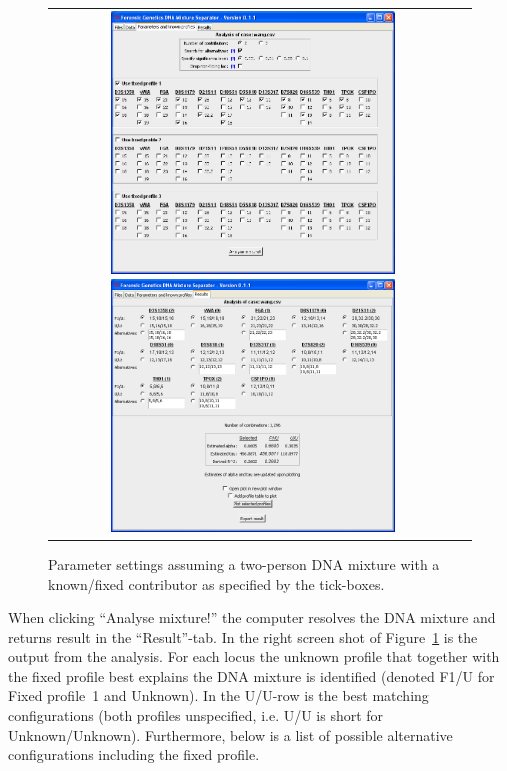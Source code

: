 \documentclass[a4paper,11pt]{article}
\begin{document}
\begin{figure}[!h]
  \centering
      \begin{tabular}{cc}
      \parbox[b]{7.5cm}{\includegraphics[width=7.5cm]{param_suspect}}
      \parbox[b]{7.5cm}{\includegraphics[width=7.5cm]{result_suspect}}
      \end{tabular}
      \caption{\label{fig:paramsuspect}Parameter settings assuming a
        two-person DNA mixture with a known/fixed contributor as
        specified by the tick-boxes.}
\end{figure}

When clicking ``Analyse mixture!'' the computer resolves the DNA
mixture and returns result in the ``Result''-tab. In the right screen
shot of Figure~\ref{fig:paramsuspect} is the output from the
analysis. For each locus the unknown profile that together with the
fixed profile best explains the DNA mixture is identified (denoted
F1/U for Fixed profile~1 and Unknown). In the U/U-row is the best
matching configurations (both profiles unspecified, i.e. U/U is short
for Unknown/Unknown). Furthermore, below is a list of possible
alternative configurations including the fixed profile.
\end{document}
